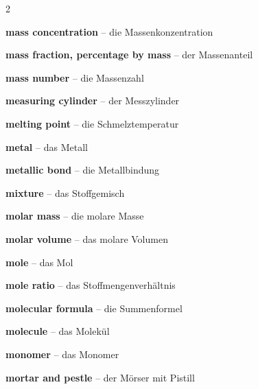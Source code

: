 \begin{multicols}{2}
\par\nopagebreak
\textbf{mass concentration} -- die Massenkonzentration\dotfill\hyperref[e:256]{\pageref*{e:256}}\par
\textbf{mass fraction, percentage by mass} -- der Massenanteil\dotfill\hyperref[e:257]{\pageref*{e:257}}\par
\textbf{mass number} -- die Massenzahl\dotfill\hyperref[e:81]{\pageref*{e:81}}\par
\textbf{measuring cylinder} -- der Messzylinder\dotfill\hyperref[e:43]{\pageref*{e:43}}\par
\textbf{melting point} -- die Schmelztemperatur\dotfill\hyperref[e:25]{\pageref*{e:25}}\par
\textbf{metal} -- das Metall\dotfill\hyperref[e:18]{\pageref*{e:18}}\par
\textbf{metallic bond} -- die Metallbindung\dotfill\hyperref[e:115]{\pageref*{e:115}}\par
\textbf{mixture} -- das Stoffgemisch\dotfill\hyperref[e:5]{\pageref*{e:5}}\par
\textbf{molar mass} -- die molare Masse\dotfill\hyperref[e:252]{\pageref*{e:252}}\par
\textbf{molar volume} -- das molare Volumen\dotfill\hyperref[e:253]{\pageref*{e:253}}\par
\textbf{mole} -- das Mol\dotfill\hyperref[e:249]{\pageref*{e:249}}\par
\textbf{mole ratio} -- das Stoffmengenverhältnis\dotfill\hyperref[e:259]{\pageref*{e:259}}\par
\textbf{molecular formula} -- die Summenformel\dotfill\hyperref[e:102]{\pageref*{e:102}}\par
\textbf{molecule} -- das Molekül\dotfill\hyperref[e:100]{\pageref*{e:100}}\par
\textbf{monomer} -- das Monomer\dotfill\hyperref[e:236]{\pageref*{e:236}}\par
\textbf{mortar and pestle} -- der Mörser mit Pistill\dotfill\hyperref[e:54]{\pageref*{e:54}}\par


\end{multicols}
